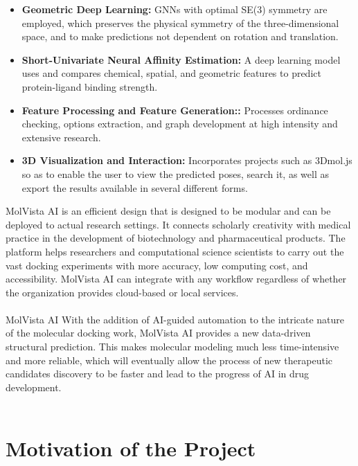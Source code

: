 \documentclass[12pt,a4]{report}
\begin{document}
\begin{itemize}
    \item \textbf{Geometric Deep Learning:} GNNs with optimal SE(3) symmetry are employed, which preserves the physical symmetry of the three-dimensional space, and to make predictions not dependent on rotation and translation.
    \item \textbf{Short-Univariate Neural Affinity Estimation:} A deep learning model uses and compares chemical, spatial, and geometric features to predict protein-ligand binding strength.
    \item \textbf{Feature Processing and Feature Generation::} Processes ordinance checking, options extraction, and graph development at high intensity and extensive research.
    \item \textbf{3D Visualization and Interaction:} Incorporates projects such as 3Dmol.js so as to enable the user to view the predicted poses, search it, as well as export the results available in several different forms.\\
\end{itemize}

\hspace*{0.3in}MolVista AI is an efficient design that is designed to be modular and can be deployed to actual research settings. It connects scholarly creativity with medical practice in the development of biotechnology and pharmaceutical products. The platform helps researchers and computational science scientists to carry out the vast docking experiments with more accuracy, low computing cost, and accessibility. MolVista AI can integrate with any workflow regardless of whether the organization provides cloud-based or local services.\\\\
\hspace*{0.3in}MolVista AI With the addition of AI-guided automation to the intricate nature of the molecular docking work, MolVista AI provides a new data-driven structural prediction. This makes molecular modeling much less time-intensive and more reliable, which will eventually allow the process of new therapeutic candidates discovery to be faster and lead to the progress of AI in drug development.
\\\\


\section{Motivation of the Project}
\end{document}
